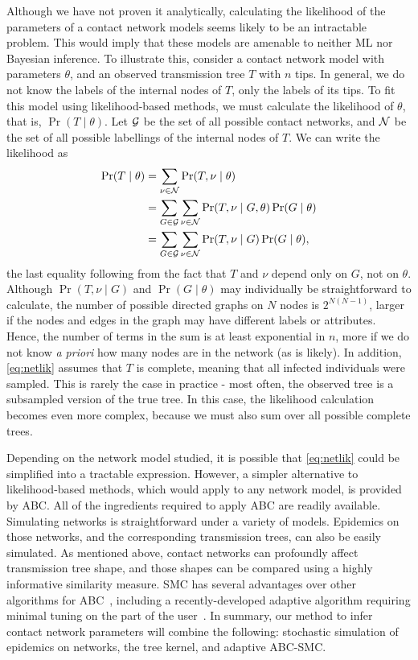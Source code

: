 Although we have not proven it analytically, calculating the likelihood of the
parameters of a contact network models seems likely to be an intractable
problem. This would imply that these models are amenable to neither \gls{ML}
nor Bayesian inference. To illustrate this, consider a contact network model
with parameters $\theta$, and an observed transmission tree $T$ with $n$ tips.
In general, we do not know the labels of the internal nodes of $T$, only the
labels of its tips. To fit this model using likelihood-based methods, we must
calculate the likelihood of $\theta$, that is, $\Pr(T \mid \theta)$. Let $\mathcal{G}$
be the set of all possible contact networks, and $\mathcal{N}$ be the set of all
possible labellings of the internal nodes of $T$. We can write the likelihood as
\begin{align}
\begin{split}
  \label{eq:netlik}
  \Pr(T \mid \theta)
    &= \sum_{\nu \in \mathcal{N}} \Pr(T, \nu \mid \theta) \\
    &= \sum_{G \in \mathcal{G}} \sum_{\nu \in \mathcal{N}} \Pr(T, \nu \mid G, \theta) \Pr(G \mid \theta) \\
    &= \sum_{G \in \mathcal{G}} \sum_{\nu \in \mathcal{N}} \Pr(T, \nu \mid G) \Pr(G \mid \theta),
\end{split}
\end{align}
the last equality following from the fact that $T$ and $\nu$ depend only on
$G$, not on $\theta$. Although $\Pr(T, \nu \mid G)$ and $\Pr(G \mid \theta)$
may individually be straightforward to calculate, the number of possible
directed graphs on $N$ nodes is $2^{N(N-1)}$, larger if the nodes and edges in
the graph may have different labels or attributes. Hence, the number of terms
in the sum is at least exponential in $n$, more if we do not know \textit{a
priori} how many nodes are in the network (as is likely). In addition,
\cref{eq:netlik} assumes that $T$ is complete, meaning that all infected
individuals were sampled. This is rarely the case in practice - most often, the
observed tree is a subsampled version of the true tree. In this case, the
likelihood calculation becomes even more complex, because we must also sum over
all possible complete trees.

Depending on the network model studied, it is possible that \cref{eq:netlik}
could be simplified into a tractable expression. However, a simpler alternative 
to likelihood-based methods, which would apply to any network model, is
provided by \gls{ABC}. All of the ingredients required to apply \gls{ABC} are
readily available. Simulating networks is straightforward under a variety of
models. Epidemics on those networks, and the corresponding transmission trees,
can also be easily simulated. As mentioned above, contact networks can
profoundly affect transmission tree shape, and those shapes can be compared
using a highly informative similarity measure. \Gls{SMC} has several advantages
over other algorithms for \gls{ABC}~\autocite{mckinley2009inference}, including
a recently-developed adaptive algorithm requiring minimal tuning on the part of
the user~\autocite{del2012adaptive}. In summary, our method to infer contact
network parameters will combine the following: stochastic simulation of
epidemics on networks, the tree kernel, and adaptive \gls{ABC}-\gls{SMC}.
